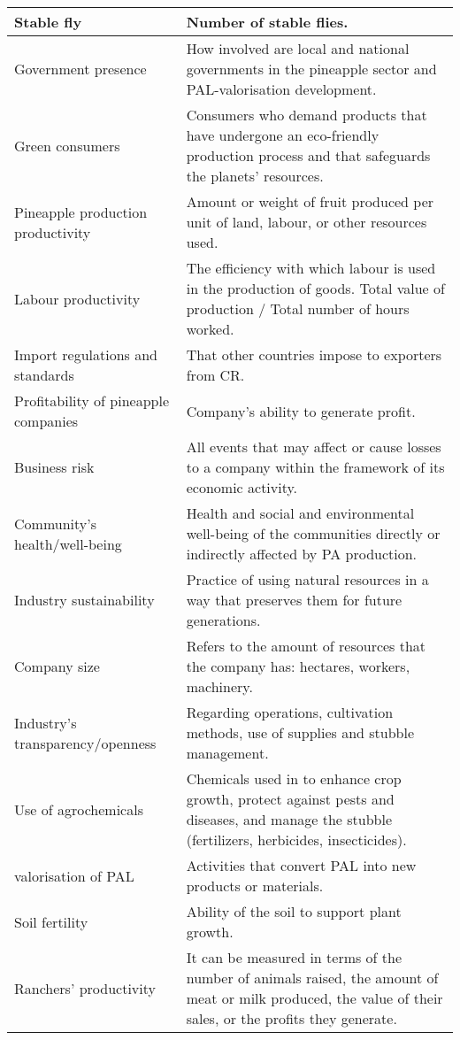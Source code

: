 \begin{xltabular}{\textwidth}{XX}
Stable fly &
  Number of stable flies. \\ \hline
Government presence &
  How involved are local and national governments in the pineapple sector and PAL-valorisation development. \\ \hline
Green consumers &
  Consumers who demand products that have undergone an eco-friendly production process and that safeguards the planets' resources. \\ \hline
Pineapple production productivity &
  Amount or weight of fruit produced per unit of land, labour, or other resources used. \\ \hline
Labour productivity &
  The efficiency with which labour is used in the production of goods. Total value of production / Total number of hours worked. \\ \hline
Import regulations and standards &
  That other countries impose to exporters from CR. \\ \hline
Profitability of pineapple companies &
  Company's ability to generate profit. \\ \hline
Business risk &
  All events that may affect or cause losses to a company within the framework of its economic activity. \\ \hline
Community's health/well-being &
  Health and social and environmental well-being of the communities directly or indirectly affected by PA production. \\ \hline
Industry sustainability &
  Practice of using natural resources in a way that preserves them for future generations. \\ \hline
Company  size &
  Refers to the amount of resources that the company has: hectares, workers, machinery. \\ \hline
Industry's transparency/openness &
  Regarding operations, cultivation methods, use of supplies and stubble management. \\ \hline
Use of agrochemicals &
  Chemicals used in to enhance crop growth, protect against pests and diseases, and manage the stubble (fertilizers, herbicides, insecticides). \\ \hline
valorisation of PAL &
  Activities that convert PAL into new products or materials. \\ \hline
Soil fertility &
  Ability of the soil to support plant growth. \\ \hline
Ranchers' productivity &
  It can be measured in terms of the number of animals raised, the amount of meat or milk produced, the value of their sales, or the profits they generate.

\end{xltabular}

